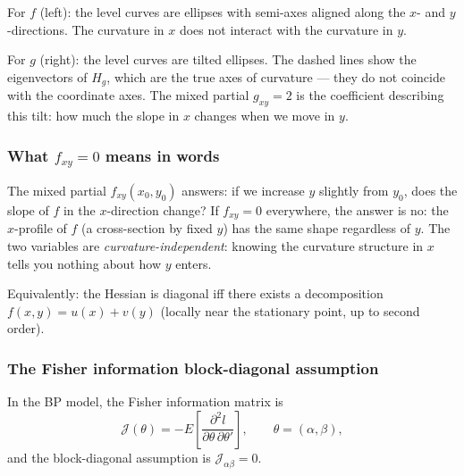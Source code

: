 \documentclass[a4paper,oneside,12pt]{extarticle}
\theoremstyle{plain}
\theoremstyle{definition}
\theoremstyle{remark}
\begin{document}
For $f$ (left): the level curves are ellipses with semi-axes
aligned along the $x$- and $y$-directions.  The curvature in
$x$ does not interact with the curvature in $y$.

For $g$ (right): the level curves are tilted ellipses.  The
dashed lines show the eigenvectors of $H_g$, which are the
true axes of curvature — they do not coincide with the
coordinate axes.  The mixed partial $g_{xy} = 2$ is the
coefficient describing this tilt: how much the slope in $x$
changes when we move in $y$.

\subsubsection*{What $f_{xy} = 0$ means in words}

The mixed partial $f_{xy}(x_0, y_0)$ answers: if we increase
$y$ slightly from $y_0$, does the slope of $f$ in the
$x$-direction change?  If $f_{xy} = 0$ everywhere, the
answer is no: the $x$-profile of $f$ (a cross-section by
fixed $y$) has the same shape regardless of $y$.  The two
variables are \emph{curvature-independent}: knowing the
curvature structure in $x$ tells you nothing about how
$y$ enters.

Equivalently: the Hessian is diagonal iff there exists a
decomposition $f(x,y) = u(x) + v(y)$ (locally near the
stationary point, up to second order).

\subsubsection*{The Fisher information block-diagonal assumption}

In the BP model, the Fisher information matrix is
\[
  \mathcal{J}(\theta)
  = -E\!\left[\frac{\partial^2 l}{\partial\theta\,\partial\theta'}\right],
  \qquad \theta = (\alpha, \beta),
\]
and the block-diagonal assumption is $\mathcal{J}_{\alpha\beta} = 0$.
\end{document}

